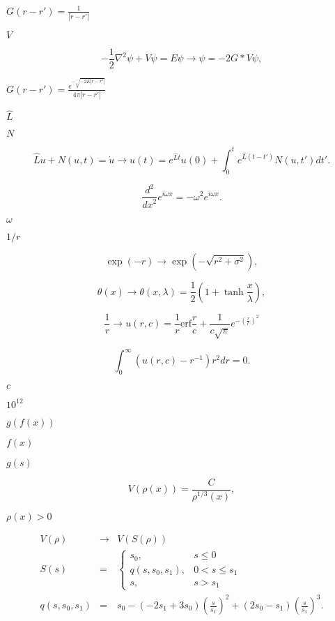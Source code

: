 \documentclass{article}
\begin{document}
$G(r-r')=\frac{1}{|r-r'|}$
\pagebreak

$V$
\pagebreak

\[
- \frac{1}{2} \nabla^{2} \psi + V\psi = E \psi \to \psi = -2G \ast V\psi,
\]
\pagebreak

$G(r-r')=\frac{e^{-\sqrt{-2E|r-r'|}}}{4\pi |r-r'|} $
\pagebreak

$\hat{L}$
\pagebreak

$N$
\pagebreak

\[
\hat{L}u + N(u,t) = \dot{u} \to u(t) = e^{\hat{L} t} u(0) + \int _{0}^{t} e^{\hat{L} (t-t')} N(u,t') \mathit{d}t'.
\]
\pagebreak

\[
\frac{d^{2}}{\mathit{dx}^{2}}e^{i\omega x}=-\omega ^{2}e^{i\omega x}.
\]
\pagebreak

$\omega$
\pagebreak

$1/r$
\pagebreak

\[
\exp(-r) \to \exp (-\sqrt{r^{2}+\sigma ^{2}}),
\]
\pagebreak

\[
\theta(x) \to \theta(x, \lambda) = \frac{1}{2} (1 + \tanh\frac{x}{\lambda}),
\]
\pagebreak

\[
\frac{1}{r} \to u(r,c) = \frac{1}{r} \mathrm{erf} \frac{r}{c} + \frac{1}{c\sqrt{\pi}} e^{-\left( \frac{r}{c} \right)^{2}}
\]
\pagebreak

\[
\int_{0}^{\infty} \left(u(r, c) - r^{-1}\right) r^{2} d\mathit{r} = 0.
\]
\pagebreak

$c$
\pagebreak

$10^{12}$
\pagebreak

$g(f(x))$
\pagebreak

$f(x)$
\pagebreak

$g(s)$
\pagebreak

\[
V(\rho(x)) = \frac{C}{\rho^{1/3}(x)},
\]
\pagebreak

$\rho (x)>0$
\pagebreak

\begin{eqnarray*}
V(\rho) & \to & V(S(\rho)) \\
S(s) & = & \left\{ \begin{array}{ll} s_{0}, & s\le 0 \\ q(s, s_{0}, s_{1}), & 0 < s \le s_{1} \\ s, & s > s_{1} \end{array} \right. \\
q(s, s_{0}, s_{1}) & = & s_{0} - (-2s_{1} + 3s_{0}) \left( \frac{s}{s_{1}} \right)^{2} + (2s_{0} - s_{1}) \left(\frac{s}{s_{1}}\right)^{3}.
\end{eqnarray*}
\pagebreak
\end{document}
